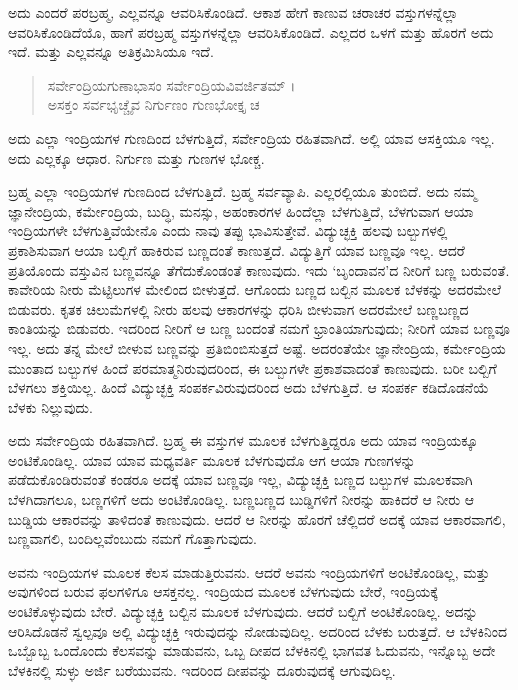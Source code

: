 ಅದು ಎಂದರೆ ಪರಬ್ರಹ್ಮ, ಎಲ್ಲವನ್ನೂ ಆವರಿಸಿಕೊಂಡಿದೆ. ಆಕಾಶ ಹೇಗೆ ಕಾಣುವ ಚರಾಚರ ವಸ್ತುಗಳನ್ನೆಲ್ಲಾ ಆವರಿಸಿಕೊಂಡಿದೆಯೊ, ಹಾಗೆ ಪರಬ್ರಹ್ಮ ವಸ್ತುಗಳನ್ನೆಲ್ಲಾ ಆವರಿಸಿಕೊಂಡಿದೆ. ಎಲ್ಲದರ ಒಳಗೆ ಮತ್ತು ಹೊರಗೆ ಅದು ಇದೆ. ಮತ್ತು ಎಲ್ಲವನ್ನೂ ಅತಿಕ್ರಮಿಸಿಯೂ ಇದೆ.

\begin{verse}
ಸರ್ವೇಂದ್ರಿಯಗುಣಾಭಾಸಂ ಸರ್ವೇಂದ್ರಿಯವಿವರ್ಜಿತಮ್ ।\\ಅಸಕ್ತಂ ಸರ್ವಭೃಚ್ಚೈವ ನಿರ್ಗುಣಂ ಗುಣಭೋಕ್ತೃ ಚ 
\end{verse}

{\small ಅದು ಎಲ್ಲಾ ಇಂದ್ರಿಯಗಳ ಗುಣದಿಂದ ಬೆಳಗುತ್ತಿದೆ, ಸರ್ವೇಂದ್ರಿಯ ರಹಿತವಾಗಿದೆ. ಅಲ್ಲಿ ಯಾವ ಆಸಕ್ತಿಯೂ ಇಲ್ಲ. ಅದು ಎಲ್ಲಕ್ಕೂ ಆಧಾರ. ನಿರ್ಗುಣ ಮತ್ತು ಗುಣಗಳ ಭೋಕ್ಚ.}

ಬ್ರಹ್ಮ ಎಲ್ಲಾ ಇಂದ್ರಿಯಗಳ ಗುಣದಿಂದ ಬೆಳಗುತ್ತಿದೆ. ಬ್ರಹ್ಮ ಸರ್ವವ್ಯಾಪಿ. ಎಲ್ಲರಲ್ಲಿಯೂ ತುಂಬಿದೆ. ಅದು ನಮ್ಮ ಜ್ಞಾನೇಂದ್ರಿಯ, ಕರ್ಮೇಂದ್ರಿಯ, ಬುದ್ಧಿ, ಮನಸ್ಸು, ಅಹಂಕಾರಗಳ ಹಿಂದೆಲ್ಲಾ ಬೆಳಗುತ್ತಿದೆ, ಬೆಳಗುವಾಗ ಆಯಾ ಇಂದ್ರಿಯಗಳೇ ಬೆಳಗುತ್ತಿವೆಯೇನೊ ಎಂದು ನಾವು ತಪ್ಪು ಭಾವಿಸುತ್ತೇವೆ. ವಿದ್ಯುಚ್ಛಕ್ತಿ ಹಲವು ಬಲ್ಬುಗಳಲ್ಲಿ ಪ್ರಕಾಶಿಸುವಾಗ ಆಯಾ ಬಲ್ಬಿಗೆ ಹಾಕಿರುವ ಬಣ್ಣದಂತೆ ಕಾಣುತ್ತದೆ. ವಿದ್ಯುತ್ತಿಗೆ ಯಾವ ಬಣ್ಣವೂ ಇಲ್ಲ. ಆದರೆ ಪ್ರತಿಯೊಂದು ವಸ್ತುವಿನ ಬಣ್ಣವನ್ನೂ ತೆಗೆದುಕೊಂಡಂತೆ ಕಾಣುವುದು. ಇದು ‘ಬೃಂದಾವನ’ದ ನೀರಿಗೆ ಬಣ್ಣ ಬರುವಂತೆ. ಕಾವೇರಿಯ ನೀರು ಮೆಟ್ಟಿಲುಗಳ ಮೇಲಿಂದ ಬೀಳುತ್ತದೆ. ಆಗೊಂದು ಬಣ್ಣದ ಬಲ್ಬಿನ ಮೂಲಕ ಬೆಳಕನ್ನು ಅದರಮೇಲೆ ಬಿಡುವರು. ಕೃತಕ ಚಿಲುಮೆಗಳಲ್ಲಿ ನೀರು ಹಲವು ಆಕಾರಗಳನ್ನು ಧರಿಸಿ ಬೀಳುವಾಗ ಅದರಮೇಲೆ ಬಣ್ಣಬಣ್ಣದ ಕಾಂತಿಯನ್ನು ಬಿಡುವರು. ಇದರಿಂದ ನೀರಿಗೆ ಆ ಬಣ್ಣ ಬಂದಂತೆ ನಮಗೆ ಭ್ರಾಂತಿಯಾಗುವುದು; ನೀರಿಗೆ ಯಾವ ಬಣ್ಣವೂ ಇಲ್ಲ. ಅದು ತನ್ನ ಮೇಲೆ ಬೀಳುವ ಬಣ್ಣವನ್ನು ಪ್ರತಿಬಿಂಬಿಸುತ್ತದೆ ಅಷ್ಟೆ. ಅದರಂತೆಯೇ ಜ್ಞಾನೇಂದ್ರಿಯ, ಕರ್ಮೇಂದ್ರಿಯ ಮುಂತಾದ ಬಲ್ಬುಗಳ ಹಿಂದೆ ಪರಮಾತ್ಮನಿರುವುದರಿಂದ, ಈ ಬಲ್ಬುಗಳೇ ಪ್ರಕಾಶವಾದಂತೆ ಕಾಣುವುದು. ಬರೀ ಬಲ್ಬಿಗೆ ಬೆಳಗಲು ಶಕ್ತಿಯಿಲ್ಲ. ಹಿಂದೆ ವಿದ್ಯುಚ್ಛಕ್ತಿ ಸಂಪರ್ಕವಿರುವುದರಿಂದ ಅದು ಬೆಳಗುತ್ತಿದೆ. ಆ ಸಂಪರ್ಕ ಕಡಿದೊಡನೆಯೆ ಬೆಳಕು ನಿಲ್ಲುವುದು.

ಅದು ಸರ್ವೇಂದ್ರಿಯ ರಹಿತವಾಗಿದೆ. ಬ್ರಹ್ಮ ಈ ವಸ್ತುಗಳ ಮೂಲಕ ಬೆಳಗುತ್ತಿದ್ದರೂ ಅದು ಯಾವ ಇಂದ್ರಿಯಕ್ಕೂ ಅಂಟಿಕೊಂಡಿಲ್ಲ. ಯಾವ ಯಾವ ಮಧ್ಯವರ್ತಿ ಮೂಲಕ ಬೆಳಗುವುದೊ ಆಗ ಆಯಾ ಗುಣಗಳನ್ನು ಪಡೆದುಕೊಂಡಿರುವಂತೆ ಕಂಡರೂ ಅದಕ್ಕೆ ಯಾವ ಬಣ್ಣವೂ ಇಲ್ಲ, ವಿದ್ಯುಚ್ಛಕ್ತಿ ಬಣ್ಣದ ಬಲ್ಬುಗಳ ಮೂಲಕವಾಗಿ ಬೆಳಗಿದಾಗಲೂ, ಬಣ್ಣಗಳಿಗೆ ಅದು ಅಂಟಿಕೊಂಡಿಲ್ಲ. ಬಣ್ಣಬಣ್ಣದ ಬುಡ್ಡಿಗಳಿಗೆ ನೀರನ್ನು ಹಾಕಿದರೆ ಆ ನೀರು ಆ ಬುಡ್ಡಿಯ ಆಕಾರವನ್ನು ತಾಳಿದಂತೆ ಕಾಣುವುದು. ಆದರೆ ಆ ನೀರನ್ನು ಹೊರಗೆ ಚೆಲ್ಲಿದರೆ ಅದಕ್ಕೆ ಯಾವ ಆಕಾರವಾಗಲಿ, ಬಣ್ಣವಾಗಲಿ, ಬಂದಿಲ್ಲವೆಂಬುದು ನಮಗೆ ಗೊತ್ತಾಗುವುದು.

ಅವನು ಇಂದ್ರಿಯಗಳ ಮೂಲಕ ಕೆಲಸ ಮಾಡುತ್ತಿರುವನು. ಆದರೆ ಅವನು ಇಂದ್ರಿಯಗಳಿಗೆ ಅಂಟಿಕೊಂಡಿಲ್ಲ, ಮತ್ತು ಅವುಗಳಿಂದ ಬರುವ ಫಲಗಳಿಗೂ ಆಸಕ್ತನಲ್ಲ. ಇಂದ್ರಿಯದ ಮೂಲಕ ಬೆಳಗುವುದು ಬೇರೆ, ಇಂದ್ರಿಯಕ್ಕೆ ಅಂಟಿಕೊಳ್ಳುವುದು ಬೇರೆ. ವಿದ್ಯುಚ್ಛಕ್ತಿ ಬಲ್ಬಿನ ಮೂಲಕ ಬೆಳಗುವುದು. ಆದರೆ ಬಲ್ಬಿಗೆ ಅಂಟಿಕೊಂಡಿಲ್ಲ. ಅದನ್ನು ಆರಿಸಿದೊಡನೆ ಸ್ವಲ್ಪವೂ ಅಲ್ಲಿ ವಿದ್ಯುಚ್ಛಕ್ತಿ ಇರುವುದನ್ನು ನೋಡುವುದಿಲ್ಲ. ಅದರಿಂದ ಬೆಳಕು ಬರುತ್ತದೆ. ಆ ಬೆಳಕಿನಿಂದ ಒಬ್ಬೊಬ್ಬ ಒಂದೊಂದು ಕೆಲಸವನ್ನು ಮಾಡುವನು, ಒಬ್ಬ ದೀಪದ ಬೆಳಕಿನಲ್ಲಿ ಭಾಗವತ ಓದುವನು, ಇನ್ನೊಬ್ಬ ಅದೇ ಬೆಳಕಿನಲ್ಲಿ ಸುಳ್ಳು ಅರ್ಜಿ ಬರೆಯುವನು. ಇದರಿಂದ ದೀಪವನ್ನು ದೂರುವುದಕ್ಕೆ ಆಗುವುದಿಲ್ಲ.

